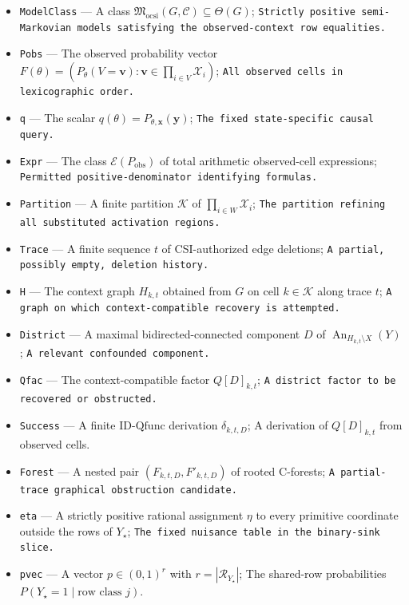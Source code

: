 \documentclass{article}
\begin{document}
\begin{itemize}
  \item \texttt{ModelClass} --- A class \(\mathfrak M_{\mathrm{ocsi}}(G,\mathcal C)\subseteq\Theta(G)\); \texttt{Strictly positive semi-\allowbreak{}Markovian models satisfying the observed-\allowbreak{}context row equalities.}
  \item \texttt{Pobs} --- The observed probability vector \(F(\theta)=(P_{\theta}(V=\mathbf v):\mathbf v\in\prod_{i\in V}\mathcal X_i)\); \texttt{All observed cells in lexicographic order.}
  \item \texttt{q} --- The scalar \(q(\theta)=P_{\theta,\mathbf x}(\mathbf y)\); \texttt{The fixed state-\allowbreak{}specific causal query.}
  \item \texttt{Expr} --- The class \(\mathscr E(P_{\mathrm{obs}})\) of total arithmetic observed-cell expressions; \texttt{Permitted positive-\allowbreak{}denominator identifying formulas.}
  \item \texttt{Partition} --- A finite partition \(\mathcal K\) of \(\prod_{i\in W}\mathcal X_i\); \texttt{The partition refining all substituted activation regions.}
  \item \texttt{Trace} --- A finite sequence \(t\) of CSI-authorized edge deletions; \texttt{A partial,\allowbreak{} possibly empty,\allowbreak{} deletion history.}
  \item \texttt{H} --- The context graph \(H_{k,t}\) obtained from \(G\) on cell \(k\in\mathcal K\) along trace \(t\); \texttt{A graph on which context-\allowbreak{}compatible recovery is attempted.}
  \item \texttt{District} --- A maximal bidirected-connected component \(D\) of \(\operatorname{An}_{H_{k,t}\setminus X}(Y)\); \texttt{A relevant confounded component.}
  \item \texttt{Qfac} --- The context-compatible factor \(Q[D]_{k,t}\); \texttt{A district factor to be recovered or obstructed.}
  \item \texttt{Success} --- A finite \(\mathrm{ID\text{-}Qfunc}\) derivation \(\delta_{k,t,D}\); A derivation of \(Q[D]_{k,t}\) from observed cells.
  \item \texttt{Forest} --- A nested pair \((F_{k,t,D},F'_{k,t,D})\) of rooted C-forests; \texttt{A partial-\allowbreak{}trace graphical obstruction candidate.}
  \item \texttt{eta} --- A strictly positive rational assignment \(\eta\) to every primitive coordinate outside the rows of \(Y_{\star}\); \texttt{The fixed nuisance table in the binary-\allowbreak{}sink slice.}
  \item \texttt{pvec} --- A vector \(p\in(0,1)^r\) with \(r=|\mathcal R_{Y_{\star}}|\); The shared-row probabilities \(P(Y_{\star}=1\mid\text{row class }j)\).

\end{itemize}
\end{document}
